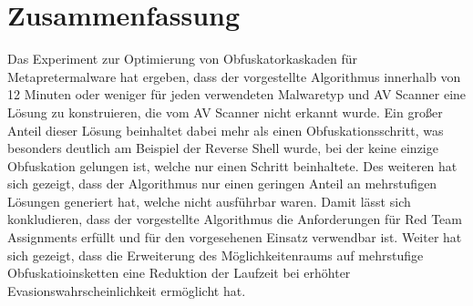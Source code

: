 \section{Zusammenfassung}
Das Experiment zur Optimierung von Obfuskatorkaskaden für Metapretermalware hat ergeben, dass der vorgestellte Algorithmus innerhalb von 12 Minuten oder weniger für jeden verwendeten Malwaretyp und AV Scanner eine Lösung zu konstruieren, die vom AV Scanner nicht erkannt wurde. Ein großer Anteil dieser Lösung beinhaltet dabei mehr als einen Obfuskationsschritt, was besonders deutlich am Beispiel der Reverse Shell wurde, bei der keine einzige Obfuskation gelungen ist, welche nur einen Schritt beinhaltete. Des weiteren hat sich gezeigt, dass der Algorithmus nur einen geringen Anteil an mehrstufigen Lösungen generiert hat, welche nicht ausführbar waren. Damit lässt sich konkludieren, dass der vorgestellte Algorithmus die Anforderungen für Red Team Assignments erfüllt und für den vorgesehenen Einsatz verwendbar ist. Weiter hat sich gezeigt, dass die Erweiterung des Möglichkeitenraums auf mehrstufige Obfuskatioinsketten eine Reduktion der Laufzeit bei erhöhter Evasionswahrscheinlichkeit ermöglicht hat.
